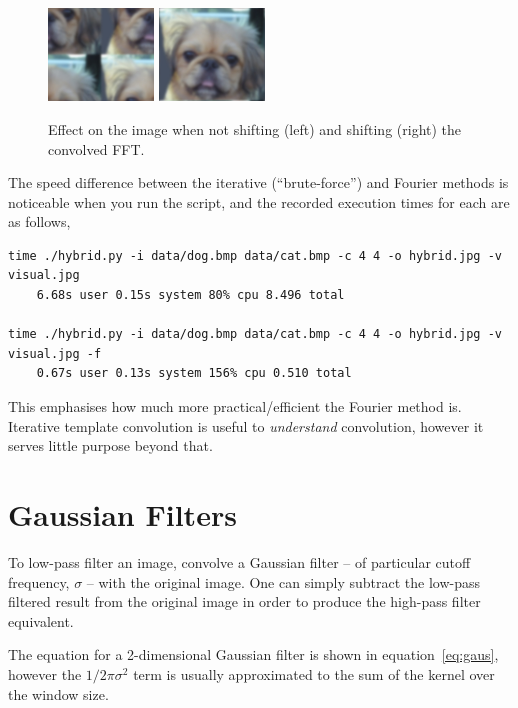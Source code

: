 \documentclass[a4paper]{article}
\begin{document}
\begin{figure}[!htbp]
    \centering
    \includegraphics[width=0.25\textwidth]{../no_shift}
    \includegraphics[width=0.25\textwidth]{../low}    
    \caption{Effect on the image when not shifting (left) and shifting (right) the convolved FFT.}
    \label{fig:no-shift}
\end{figure}

The speed difference between the iterative (``brute-force'') and Fourier methods is noticeable when you run the script, and the recorded execution times for each are as follows,

\begin{verbatim}
time ./hybrid.py -i data/dog.bmp data/cat.bmp -c 4 4 -o hybrid.jpg -v visual.jpg  
    6.68s user 0.15s system 80% cpu 8.496 total
    
time ./hybrid.py -i data/dog.bmp data/cat.bmp -c 4 4 -o hybrid.jpg -v visual.jpg -f 
    0.67s user 0.13s system 156% cpu 0.510 total
\end{verbatim}

This emphasises how much more practical/efficient the Fourier method is. Iterative template convolution is useful to \textit{understand} convolution, however it serves little purpose beyond that.

\section{Gaussian Filters}
To low-pass filter an image, convolve a Gaussian filter -- of particular cutoff frequency, $\sigma$ -- with the original image. One can simply subtract the low-pass filtered result from the original image in order to produce the high-pass filter equivalent. 

The equation for a 2-dimensional Gaussian filter is shown in equation~\ref{eq:gaus}, however the $1/2\pi\sigma^2$ term is usually approximated to the sum of the kernel over the window size.
\end{document}
